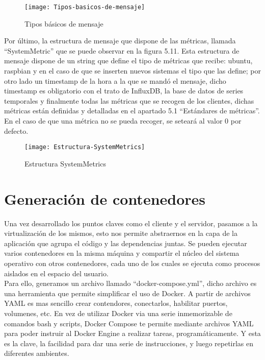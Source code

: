 \documentclass[ spanish, a4paper, 12pt, oneside]{report}
\begin{document}
\begin{figure}[!h]
   \centering
   \texttt{[image: Tipos-basicos-de-mensaje]}\\
      \caption{\label{fig: Tipos básicos de mensaje} Tipos básicos de mensaje}
\end{figure}

Por último, la estructura de mensaje que dispone de las métricas, llamada ``SystemMetric'' que se puede observar en la figura 5.11. Esta estructura de mensaje dispone de un string que define el tipo de métricas que recibe: ubuntu, raspbian y 
en el caso de que se inserten nuevos sistemas el tipo que las define; por otro lado un timestamp de la hora a la que se mandó el mensaje, dicho timestamp es obligatorio con el trato de InfluxDB, la base de datos de series temporales y finalmente todas las 
métricas que se recogen de los clientes, dichas métricas están definidas y detalladas en el apartado 5.1 ``Estándares de métricas''. En el caso de que una métrica no se pueda recoger, se seteará al valor 0 por defecto.\\

\begin{figure}[!h]
   \centering
   \texttt{[image: Estructura-SystemMetrics]}\\
      \caption{\label{fig: Estructura SystemMetrics} Estructura SystemMetrics}
\end{figure}

\section{Generación de contenedores}
Una vez desarrollado los puntos claves como el cliente y el servidor, pasamos a la virtualización de los mismos, esto nos permite abstraernos en la capa de la aplicación que agrupa el código 
y las dependencias juntas. Se pueden ejecutar varios contenedores en la misma máquina y compartir el núcleo del sistema operativo con otros contenedores, cada uno de los cuales se ejecuta como 
procesos aislados en el espacio del usuario. \\

Para ello, generamos un archivo llamado ``docker-compose.yml'', dicho archivo es una herramienta que permite simplificar el uso de Docker. A partir de archivos YAML es mas sencillo crear contendores, 
conectarlos, habilitar puertos, volumenes, etc. En vez de utilizar Docker via una serie inmemorizable de comandos bash y scripts, Docker Compose te permite mediante archivos YAML para poder instruir al 
Docker Engine a realizar tareas, programáticamente. Y esta es la clave, la facilidad para dar una serie de instrucciones, y luego repetirlas en diferentes ambientes.\\
\end{document}
